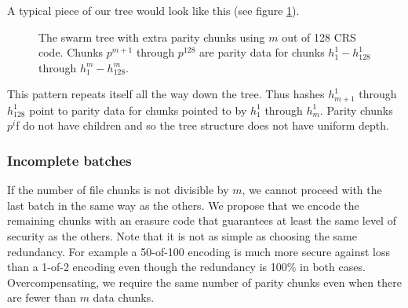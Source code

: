 
A typical piece of our tree would look like this (see figure \ref{fig:swarm-hash-erasure}).


\begin{figure}[htbp]
   \centering
   
   \caption{The swarm tree with extra parity chunks using $m$ out of 128 CRS code. Chunks $p^{m+1}$ through $p^{128}$ are parity data for chunks $h^1_1 - h^1_{128}$ through $h^{m}_1  - h^{m}_{128}$.}
   \label{fig:swarm-hash-erasure}
\end{figure}


This pattern repeats itself all the way down the tree. Thus hashes $h^1_{m+1}$ through $h^1_{128}$ point to parity data for chunks pointed to by $h^1_1$ through $h^1_{m}$. Parity chunks $p^i$f do not have children and so the tree structure does not have uniform depth.

\subsubsection{Incomplete batches}

If the number of file chunks is not divisible by $m$, we cannot proceed with the last batch in the same way as the others. We propose that we encode the remaining chunks with an erasure code that guarantees at least the same level of security as the others. Note that it is not as simple as choosing the same redundancy. For example a 50-of-100 encoding is much more secure against loss than a 1-of-2 encoding even though the redundancy is 100\% in both cases. Overcompensating, we require the same number of parity chunks even when there are fewer than $m$ data chunks.

